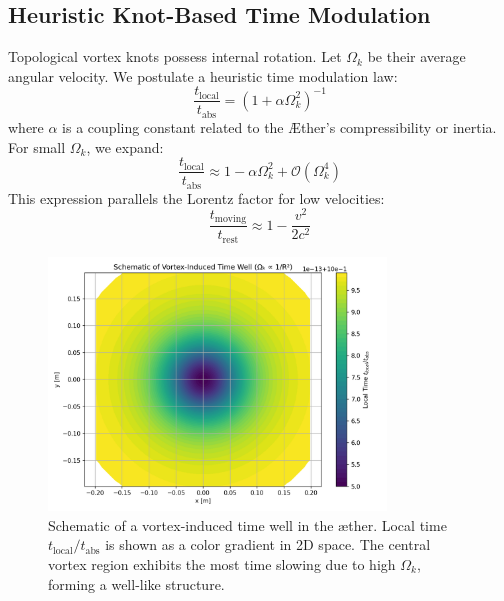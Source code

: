 \subsection{Heuristic Knot-Based Time Modulation}
Topological vortex knots possess internal rotation. Let $\Omega_k$ be their average angular velocity. We postulate a heuristic time modulation law:
\begin{equation}
    \label{eq:heuristic}
    \frac{t_{\text{local}}}{t_{\text{abs}}} = \left(1 + \alpha \Omega_k^2 \right)^{-1}
\end{equation}
where $\alpha$ is a coupling constant related to the Æther's compressibility or inertia. For small $\Omega_k$, we expand:
\begin{equation}
    \frac{t_{\text{local}}}{t_{\text{abs}}} \approx 1 - \alpha \Omega_k^2 + \mathcal{O}(\Omega_k^4)
\end{equation}
This expression parallels the Lorentz factor for low velocities:
\[
    \frac{t_{\text{moving}}}{t_{\text{rest}}} \approx 1 - \frac{v^2}{2c^2}
\]

\begin{figure}[h!]
    \centering
    \includegraphics[width=0.8\textwidth]{export/RadialProfileOfLocalTimeDilation_Vortex-Induced_Time_Well}
    \caption{Schematic of a vortex-induced time well in the æther. Local time $t_{\text{local}} / t_{\text{abs}}$ is shown as a color gradient in 2D space. The central vortex region exhibits the most time slowing due to high $\Omega_k$, forming a well-like structure.}
    \label{fig:vortex_time_well}
\end{figure}



